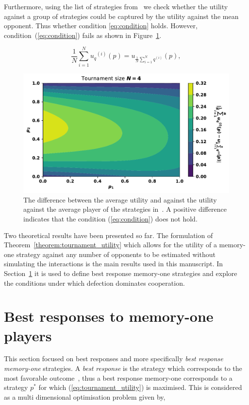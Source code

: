 \documentclass[10pt]{article}
\begin{document}
Furthermore, using the list of strategies from~\cite{Stewart2012} we check
whether the utility against a group of strategies could be
captured by the utility against the mean opponent. Thus whether condition
\ref{eq:condition} holds. However, condition~(\ref{eq:condition}) fails as shown
in Figure~\ref{fig:hypothesis}.

\begin{equation}\label{eq:condition}
    \frac{1}{N} \sum_{i=1} ^ {N} {u_q}^{(i)} (p) = u_{\frac {1}{N} \sum\limits_{i=1} ^ N q^{(i)}}(p),
\end{equation}

\begin{figure}[!htbp]
    \begin{center}
    \includegraphics[width=.5\linewidth]{img/mean_vs_average_heatmap.pdf}
    \end{center}
    \caption{The difference between the average utility and against
    the utility against the average player of the strategies in~\cite{Stewart2012}.
    A positive difference indicates that the condition (\ref{eq:condition})
    does not hold.}
    \label{fig:hypothesis}
\end{figure}

Two theoretical results have been presented so far. The formulation of
Theorem~\ref{theorem:tournament_utility} which allows for the utility of a
memory-one strategy against any number of opponents to be estimated without
simulating the interactions is the main results used in this manuscript. In
Section~\ref{section:best_response_mem_one} it is used to  define best response
memory-one strategies and explore the conditions under which defection dominates
cooperation.

\section{Best responses to memory-one players}\label{section:best_response_mem_one}

This section focused on best responses and more specifically \textit{best
response memory-one} strategies. A \textit{best response} is the strategy which
corresponds to the most favorable outcome~\cite{Tadelis2013}, thus a best
response memory-one corresponds to a strategy \(p^*\) for which
(\ref{eq:tournament_utility}) is maximised. This is considered as a multi dimensional
optimisation problem given by,
\end{document}

